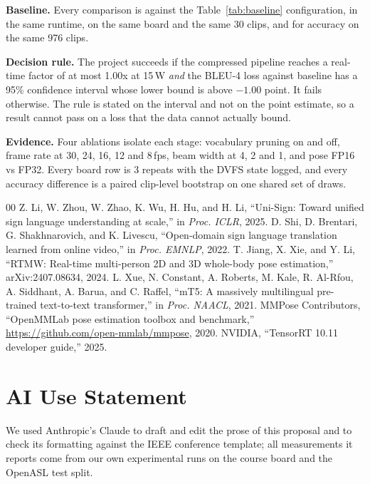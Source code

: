 \documentclass[conference]{IEEEtran}
\begin{document}
\label{m2}\textbf{Baseline.} Every comparison is against the Table~\ref{tab:baseline}
configuration, in the same runtime, on the same board and the same 30 clips, and for
accuracy on the same 976 clips.

\label{m3}\textbf{Decision rule.} The project succeeds if the compressed pipeline reaches
a real-time factor of at most 1.00x at 15\,W \emph{and} the BLEU-4 loss against baseline
has a 95\% confidence interval whose lower bound is above $-1.00$ point. It fails otherwise. The rule is stated on the interval and not on the point estimate, so a result
cannot pass on a loss that the data cannot actually bound.

\label{evidencestart}\textbf{Evidence.} Four ablations isolate each stage: vocabulary
pruning on and off, frame rate at 30, 24, 16, 12 and 8\,fps, beam width at 4, 2 and 1, and
pose FP16 vs FP32. Every board row is 3 repeats with the DVFS state logged, and every accuracy difference is a
paired clip-level bootstrap on one shared set of draws.

\label{refsstart}
\begin{thebibliography}{00}
 Z. Li, W. Zhou, W. Zhao, K. Wu, H. Hu, and H. Li, ``Uni-Sign: Toward
unified sign language understanding at scale,'' in \emph{Proc. ICLR}, 2025.
 D. Shi, D. Brentari, G. Shakhnarovich, and K. Livescu, ``Open-domain
sign language translation learned from online video,'' in \emph{Proc. EMNLP}, 2022.
 T. Jiang, X. Xie, and Y. Li, ``RTMW: Real-time multi-person 2D and 3D
whole-body pose estimation,'' arXiv:2407.08634, 2024.
 L. Xue, N. Constant, A. Roberts, M. Kale, R. Al-Rfou, A. Siddhant,
A. Barua, and C. Raffel, ``mT5: A massively multilingual pre-trained text-to-text
transformer,'' in \emph{Proc. NAACL}, 2021.
 MMPose Contributors, ``OpenMMLab pose estimation toolbox and
benchmark,'' \url{https://github.com/open-mmlab/mmpose}, 2020.
 NVIDIA, ``TensorRT 10.11 developer guide,'' 2025.
\end{thebibliography}

\section*{AI Use Statement}

We used Anthropic's Claude to draft and edit the prose of this proposal and to check its
formatting against the IEEE conference template; all measurements it reports come from our
own experimental runs on the course board and the OpenASL test split.
\end{document}
